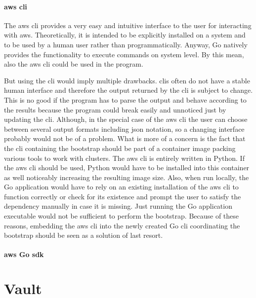 \paragraph{\ac{aws} \ac{cli}}
The \ac{aws} \ac{cli} provides a very easy and intuitive interface to the user for interacting with \ac{aws}.
Theoretically, it is intended to be explicitly installed on a system and to be used by a human user rather than programmatically.
Anyway, Go natively provides the functionality to execute commands on system level.
By this mean, also the \ac{aws} \ac{cli} could be used in the program.

But using the \ac{cli} would imply multiple drawbacks.
\acp{cli} often do not have a stable human interface and therefore the output returned by the \ac{cli} is subject to change.
This is no good if the program has to parse the output and behave according to the results because the program could break easily and unnoticed just by updating the \ac{cli}.
Although, in the special case of the \ac{aws} \ac{cli} the user can choose between several output formats including \ac{json} notation, so a changing interface probably would not be of a problem.
What is more of a concern is the fact that the \ac{cli} containing the bootstrap should be part of a container image packing various tools to work with clusters.
The \ac{aws} \ac{cli} is entirely written in Python.
If the \ac{aws} \ac{cli} should be used, Python would have to be installed into this container as well noticeably increasing the resulting image size.
Also, when run locally, the Go application would have to rely on an existing installation of the \ac{aws} \ac{cli} to function correctly or check for its existence and prompt the user to satisfy the dependency manually in case it is missing.
Just running the Go application executable would not be sufficient to perform the bootstrap.
Because of these reasons, embedding the \ac{aws} \ac{cli} into the newly created Go \ac{cli} coordinating the bootstrap should be seen as a solution of last resort.

\paragraph{\ac{aws} Go \ac{sdk}}

\section{Vault}